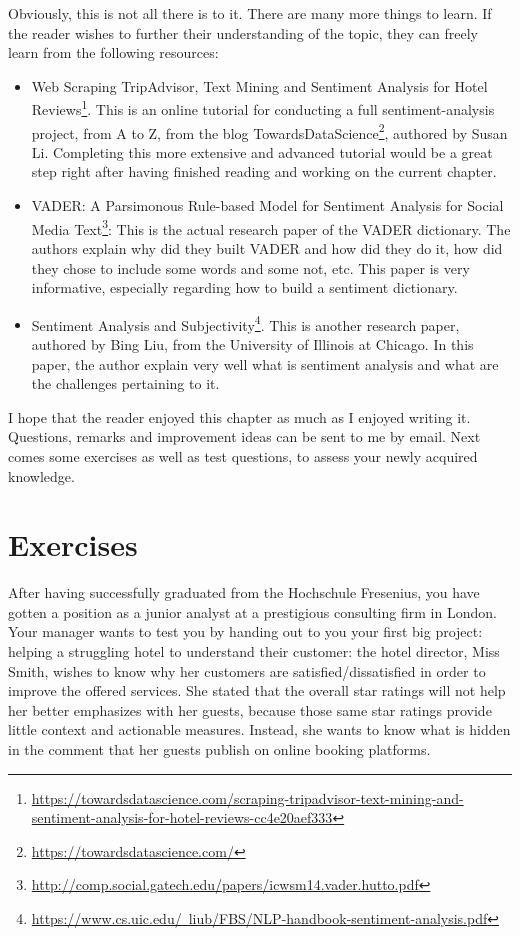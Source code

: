 	Obviously, this is not all there is to it. There are many more things to learn. If the reader wishes to further their understanding of the topic, they can freely learn from the following resources:
	\begin{itemize}
		\item Web Scraping TripAdvisor, Text Mining and Sentiment Analysis for Hotel Reviews\footnote{\href{https://towardsdatascience.com/scraping-tripadvisor-text-mining-and-sentiment-analysis-for-hotel-reviews-cc4e20aef333}{https://towardsdatascience.com/scraping-tripadvisor-text-mining-and-sentiment-analysis-for-hotel-reviews-cc4e20aef333}}. This is an online tutorial for conducting a full sentiment-analysis project, from A to Z, from the blog TowardsDataScience\footnote{\href{https://towardsdatascience.com/}{https://towardsdatascience.com/}}, authored by Susan Li. Completing this more extensive and advanced tutorial would be a great step right after having finished reading and working on the current chapter.
		\item VADER: A Parsimonous Rule-based Model for Sentiment Analysis for Social Media Text\footnote{\href{http://comp.social.gatech.edu/papers/icwsm14.vader.hutto.pdf}{http://comp.social.gatech.edu/papers/icwsm14.vader.hutto.pdf}}: This is the actual research paper of the VADER dictionary. The authors explain why did they built VADER and how did they do it, how did they chose to include some words and some not, etc. This paper is very informative, especially regarding how to build a sentiment dictionary.
		\item Sentiment Analysis and Subjectivity\footnote{\href{https://www.cs.uic.edu/~liub/FBS/NLP-handbook-sentiment-analysis.pdf}{https://www.cs.uic.edu/~liub/FBS/NLP-handbook-sentiment-analysis.pdf}}. This is another research paper, authored by Bing Liu, from the University of Illinois at Chicago. In this paper, the author explain very well what is sentiment analysis and what are the challenges pertaining to it.
	\end{itemize}

	I hope that the reader enjoyed this chapter as much as I enjoyed writing it. Questions, remarks and improvement ideas can be sent to me by email. Next comes some exercises as well as test questions, to assess your newly acquired knowledge.

	\section{Exercises}
	After having successfully graduated from the Hochschule Fresenius, you have gotten a position as a junior analyst at a prestigious consulting firm in London. Your manager wants to test you by handing out to you your first big project: helping a struggling hotel to understand their customer: the hotel director, Miss Smith, wishes to know why her customers are satisfied/dissatisfied in order to improve the offered services. She stated that the overall star ratings will not help her better emphasizes with her guests, because those same star ratings provide little context and actionable measures. Instead, she wants to know what is hidden in the comment that her guests publish on online booking platforms.

